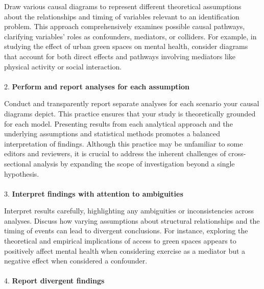 \documentclass[
  single column]{article}
\makeatletter
\let\oldparagraph\paragraph
\renewcommand{\paragraph}{
    \@ifstar
      \xxxParagraphStar
      \xxxParagraphNoStar
  }
\newcommand{\xxxParagraphStar}[1]{\oldparagraph*{#1}\mbox{}}
\newcommand{\xxxParagraphNoStar}[1]{\oldparagraph{#1}\mbox{}}
\makeatother
\begin{document}
Draw various causal diagrams to represent different theoretical
assumptions about the relationships and timing of variables relevant to
an identification problem. This approach comprehensively examines
possible causal pathways, clarifying variables' roles as confounders,
mediators, or colliders. For example, in studying the effect of urban
green spaces on mental health, consider diagrams that account for both
direct effects and pathways involving mediators like physical activity
or social interaction.

\paragraph{\texorpdfstring{2. \textbf{Perform and report analyses for
each
assumption}}{2. Perform and report analyses for each assumption}}\label{perform-and-report-analyses-for-each-assumption}

Conduct and transparently report separate analyses for each scenario
your causal diagrams depict. This practice ensures that your study is
theoretically grounded for each model. Presenting results from each
analytical approach and the underlying assumptions and statistical
methods promotes a balanced interpretation of findings. Although this
practice may be unfamiliar to some editors and reviewers, it is crucial
to address the inherent challenges of cross-sectional analysis by
expanding the scope of investigation beyond a single hypothesis.

\paragraph{\texorpdfstring{3. \textbf{Interpret findings with attention
to
ambiguities}}{3. Interpret findings with attention to ambiguities}}\label{interpret-findings-with-attention-to-ambiguities}

Interpret results carefully, highlighting any ambiguities or
inconsistencies across analyses. Discuss how varying assumptions about
structural relationships and the timing of events can lead to divergent
conclusions. For instance, exploring the theoretical and empirical
implications of access to green spaces appears to positively affect
mental health when considering exercise as a mediator but a negative
effect when considered a confounder.

\paragraph{\texorpdfstring{4. \textbf{Report divergent
findings}}{4. Report divergent findings}}\label{report-divergent-findings}
\end{document}
